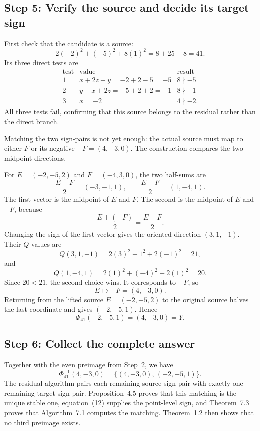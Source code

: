 \documentclass[11pt]{amsart}
\newcommand{\PhiMap}{\Phi_{41}}
\begin{document}
\newpage
\subsection*{Step 5: Verify the source and decide its target sign}

First check that the candidate is a source:
\[
 2(-2)^2+(-5)^2+8(1)^2=8+25+8=41.
\]
Its three direct tests are
\[
\begin{array}{c|c|c}
\text{test}&\text{value}&\text{result}\\ \hline
1&x+2z+y=-2+2-5=-5&8\nmid-5\\
2&y-x+2z=-5+2+2=-1&8\nmid-1\\
3&x=-2&4\nmid-2.
\end{array}
\]
All three tests fail, confirming that this source belongs to the residual
rather than the direct branch.

Matching the two sign-pairs is not yet enough: the actual source must map to
either \(F\) or its negative \(-F=(4,-3,0)\).  The construction compares the
two midpoint directions.

For \(E=(-2,-5,2)\) and \(F=(-4,3,0)\), the two half-sums are
\[
 \frac{E+F}{2}=(-3,-1,1),
 \qquad
 \frac{E-F}{2}=(1,-4,1).
\]
The first vector is the midpoint of \(E\) and \(F\).  The second is the
midpoint of \(E\) and \(-F\), because
\[
 \frac{E+(-F)}{2}=\frac{E-F}{2}.
\]
Changing the sign of the first vector gives the oriented direction
\((3,1,-1)\).  Their \(Q\)-values are
\[
 Q(3,1,-1)=2(3)^2+1^2+2(-1)^2=21,
\]
and
\[
 Q(1,-4,1)=2(1)^2+(-4)^2+2(1)^2=20.
\]
Since \(20<21\), the second choice wins.  It corresponds to \(-F\), so
\[
 E\longmapsto-F=(4,-3,0).
\]
Returning from the lifted source \(E=(-2,-5,2)\) to the original source
halves the last coordinate and gives \((-2,-5,1)\).  Hence
\[
 \PhiMap(-2,-5,1)=(4,-3,0)=Y.
\]

\subsection*{Step 6: Collect the complete answer}

Together with the even preimage from Step~2, we have
\[
 \PhiMap^{-1}(4,-3,0)
 =\{(4,-3,0),\,(-2,-5,1)\}.
\]
The residual algorithm pairs each remaining source sign-pair with exactly one
remaining target sign-pair.  Proposition~4.5 proves that this matching is the
unique stable one, equation~(12) supplies the point-level sign, and
Theorem~7.3 proves that Algorithm~7.1 computes the matching.  Theorem~1.2 then
shows that no third preimage exists.
\end{document}
